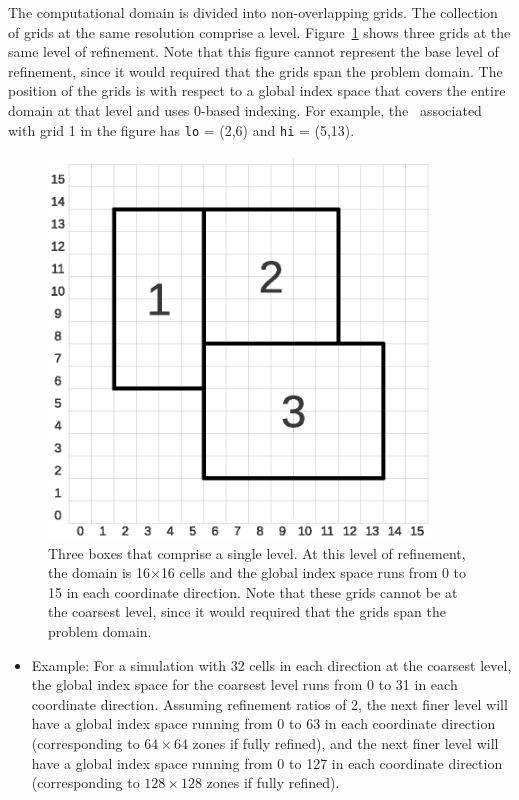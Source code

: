 The computational domain is divided into non-overlapping grids.  
The collection of grids at the same resolution comprise a level.
Figure~\ref{fig:boxes} shows three grids at the same level of
refinement.  Note that this figure cannot represent the base level of refinement,
since it would required that the grids span the problem domain.
The position of the grids is with respect to a global
index space that covers the entire domain at that level and uses 0-based indexing.
For example, the \BoxType\ associated with grid 1 
in the figure has {\tt lo} = (2,6) and {\tt hi} = (5,13).
\begin{figure}[tb]
\centering
\includegraphics[width=4.0in]{./Introduction/index_grid2}
\caption{\label{fig:boxes} Three boxes that comprise a single level.
At this level of refinement, the domain is 16$\times$16 cells and
the global index space runs from 0 to 15 in each coordinate direction.
Note that these grids cannot be at the coarsest level,
since it would required that the grids span the problem domain.}
\end{figure}

\begin{itemize}
\item Example: For a simulation with 32 cells in each direction at the coarsest level,
the global index space for the coarsest level runs from 0 to 31 in each coordinate
direction.  Assuming refinement ratios of 2, the next finer level 
will have a global index space running from 
0 to 63 in each coordinate direction (corresponding to $64 \times
64$ zones if fully refined), and the next finer level will have a global index
space running from 0 to 127 in each coordinate direction
(corresponding to $128\times 128$ zones if fully refined).
\end{itemize}

